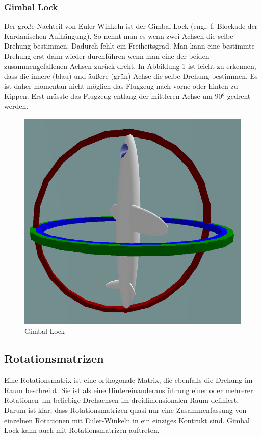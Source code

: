\subsubsection{Gimbal Lock}
Der große Nachteil von Euler-Winkeln ist der Gimbal Lock (engl. f. Blockade der Kardanischen Aufhängung). So nennt man es wenn zwei Achsen die selbe Drehung bestimmen. Dadurch fehlt ein Freiheitsgrad. Man kann eine bestimmte Drehung erst dann wieder durchführen wenn man eine der beiden zusammengefallenen Achsen zurück dreht. In Abbildung \ref{fig:gimbal-lock} ist leicht zu erkennen, dass die innere (blau) und äußere (grün) Achse die selbe Drehung bestimmen. Es ist daher momentan nicht möglich das Flugzeug nach vorne oder hinten zu Kippen. Erst müsste das Flugzeug entlang der mittleren Achse um $90^o$ gedreht werden. \cite{ wiki:002} \cite{paper:001}

\begin{figure}[htb]
\centering
\includegraphics[scale=0.4]{figures/gimbal-lock}
\caption{Gimbal Lock \cite{ wiki:004} }
\label{fig:gimbal-lock}
\end{figure}

\subsection{Rotationsmatrizen}
Eine Rotationsmatrix ist eine orthogonale Matrix, die ebenfalls die Drehung im Raum beschreibt. Sie ist als eine Hintereinanderausführung einer oder mehrerer Rotationen um beliebige Drehachsen im dreidimensionalen Raum definiert. Darum ist klar, dass Rotationsmatrizen quasi nur eine Zusammenfassung von einzelnen Rotationen mit Euler-Winkeln in ein einziges Kontrukt sind. Gimbal Lock kann auch mit Rotationsmatrizen auftreten. \cite{ wiki:003}

